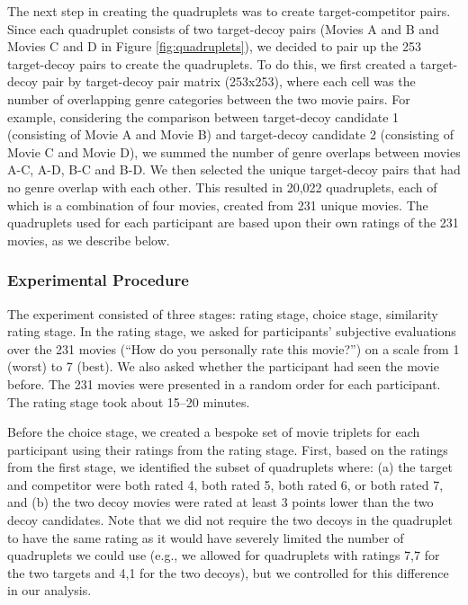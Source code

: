 \documentclass[12pt, a4paper]{article}
\begin{document}
The next step in creating the quadruplets was to create target-competitor pairs. Since each quadruplet consists of two target-decoy pairs (Movies A and B and Movies C and D in Figure \ref{fig:quadruplets}), we decided to pair up the 253 target-decoy pairs to create the quadruplets. To do this, we first created a target-decoy pair by target-decoy pair matrix (253x253), where each cell was the number of overlapping genre categories between the two movie pairs. For example, considering the comparison between target-decoy candidate 1 (consisting of Movie A and Movie B) and target-decoy candidate 2 (consisting of Movie C and Movie D), we summed the number of genre overlaps between movies A-C, A-D, B-C and B-D. We then selected the unique target-decoy pairs that had no genre overlap with each other. This resulted in 20,022 quadruplets, each of which is a combination of four movies, created from 231 unique movies. The quadruplets used for each participant are based upon their own ratings of the 231 movies, as we describe below.

\subsubsection{Experimental Procedure}

The experiment consisted of three stages: rating stage, choice stage, similarity rating stage. In the rating stage, we asked for participants' subjective evaluations over the 231 movies (``How do you personally rate this movie?'') on a scale from 1 (worst) to 7 (best). We also asked whether the participant had seen the movie before. The 231 movies were presented in a random order for each participant. The rating stage took about 15--20 minutes.

Before the choice stage, we created a bespoke set of movie triplets for each participant using their ratings from the rating stage. First, based on the ratings from the first stage, we identified the subset of quadruplets where: (a) the target and competitor were both rated 4, both rated 5, both rated 6, or both rated 7, and (b) the two decoy movies were rated at least 3 points lower than the two decoy candidates. Note that we did not require the two decoys in the quadruplet to have the same rating as it would have severely limited the number of quadruplets we could use (e.g., we allowed for quadruplets with ratings 7,7 for the two targets and 4,1 for the two decoys), but we controlled for this difference in our analysis.
\end{document}
